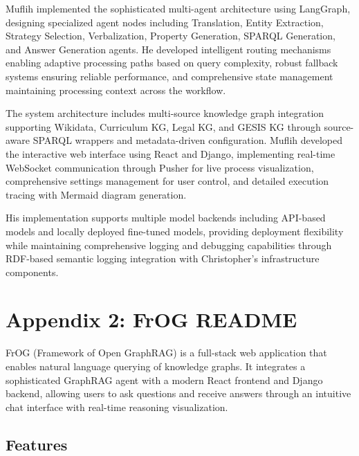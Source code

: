 Muflih implemented the sophisticated multi-agent architecture using LangGraph, designing specialized agent nodes including Translation, Entity Extraction, Strategy Selection, Verbalization, Property Generation, SPARQL Generation, and Answer Generation agents. He developed intelligent routing mechanisms enabling adaptive processing paths based on query complexity, robust fallback systems ensuring reliable performance, and comprehensive state management maintaining processing context across the workflow.

The system architecture includes multi-source knowledge graph integration supporting Wikidata, Curriculum KG, Legal KG, and GESIS KG through source-aware SPARQL wrappers and metadata-driven configuration. Muflih developed the interactive web interface using React and Django, implementing real-time WebSocket communication through Pusher for live process visualization, comprehensive settings management for user control, and detailed execution tracing with Mermaid diagram generation.

His implementation supports multiple model backends including API-based models and locally deployed fine-tuned models, providing deployment flexibility while maintaining comprehensive logging and debugging capabilities through RDF-based semantic logging integration with Christopher's infrastructure components.



\chapter*{Appendix 2: FrOG README}
\label{sec:frog-readme}

FrOG (Framework of Open GraphRAG) is a full-stack web application that enables natural language querying of knowledge graphs. It integrates a sophisticated GraphRAG agent with a modern React frontend and Django backend, allowing users to ask questions and receive answers through an intuitive chat interface with real-time reasoning visualization.

\section*{Features}

